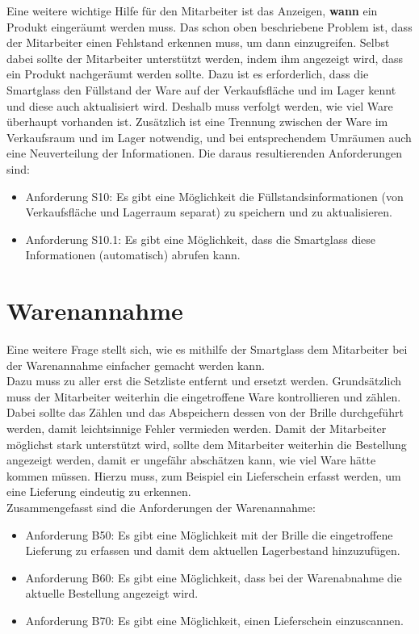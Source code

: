 Eine weitere wichtige Hilfe für den Mitarbeiter ist das Anzeigen, \textbf{wann} ein Produkt eingeräumt werden muss. Das schon oben beschriebene Problem ist, dass der Mitarbeiter einen Fehlstand erkennen muss, um dann einzugreifen. Selbst dabei sollte der Mitarbeiter unterstützt werden, indem ihm angezeigt wird,  dass ein Produkt nachgeräumt werden sollte. 
Dazu ist es erforderlich, dass die Smartglass den Füllstand der Ware auf der Verkaufsfläche und im Lager kennt und diese auch aktualisiert wird. Deshalb muss verfolgt werden, wie viel Ware überhaupt vorhanden ist. Zusätzlich ist eine Trennung zwischen der Ware im Verkaufsraum und im Lager notwendig, und bei entsprechendem Umräumen auch eine Neuverteilung der Informationen. Die daraus resultierenden Anforderungen sind: 
\begin{itemize}
	\item Anforderung S10: Es gibt eine Möglichkeit die Füllstandsinformationen (von Verkaufsfläche und Lagerraum separat) zu speichern und zu aktualisieren. \label{anforderung_s10}
	\item Anforderung S10.1: Es gibt eine Möglichkeit, dass die Smartglass diese Informationen (automatisch) abrufen kann. \label{anforderung_s10_1}
\end{itemize}
\section{Warenannahme}
Eine weitere Frage stellt sich, wie es mithilfe der Smartglass dem Mitarbeiter bei der Warenannahme einfacher gemacht werden kann. \\
Dazu muss zu aller erst die Setzliste entfernt und ersetzt werden. Grundsätzlich muss der Mitarbeiter weiterhin die eingetroffene Ware kontrollieren und zählen. Dabei sollte das Zählen und das Abspeichern dessen von der Brille durchgeführt werden, damit leichtsinnige Fehler vermieden werden. Damit der Mitarbeiter möglichst stark unterstützt wird, sollte dem Mitarbeiter weiterhin die Bestellung angezeigt werden, damit er ungefähr abschätzen kann, wie viel Ware hätte kommen müssen. Hierzu muss, zum Beispiel ein Lieferschein erfasst werden, um eine Lieferung eindeutig zu erkennen.\\
Zusammengefasst sind die Anforderungen der Warenannahme: 

\begin{itemize}
	\item Anforderung B50: Es gibt eine Möglichkeit mit der Brille die eingetroffene Lieferung zu erfassen und damit dem aktuellen Lagerbestand hinzuzufügen. \label{anforderung_b50}
	\item Anforderung B60: Es gibt eine Möglichkeit, dass bei der Warenabnahme die aktuelle Bestellung angezeigt wird. \label{anforderung_b60}
	\item Anforderung B70: Es gibt eine Möglichkeit, einen Lieferschein einzuscannen. \label{anforderung_b70}
\end{itemize}
